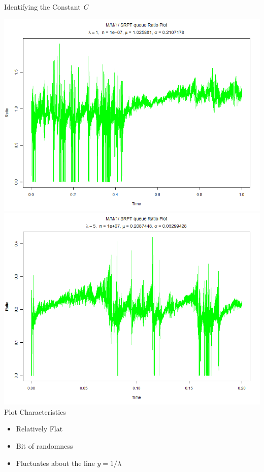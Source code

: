 \documentclass[16pt]{beamer}
\begin{document}
\begin{frame}
\begin{textblock}{35}
\begin{block}{\huge Identifying the Constant \emph{{\color{orange}C}}}
\begin{minipage}[t]{16cm}
\includegraphics[width = 16cm]{Pictures/ratio1.png}
\vspace{\baselineskip}
\includegraphics[width=16cm]{Pictures/ratio5.png}
\vspace{\baselineskip}
{\large Plot Characteristics}
\begin{itemize}
\item Relatively Flat
\item Bit of randomness
\item Fluctuates about the line $y=1/\lambda$
\end{itemize}
\vspace{\baselineskip}
\end{minipage}

\end{block}
\end{textblock}
\end{frame}
\end{document}
